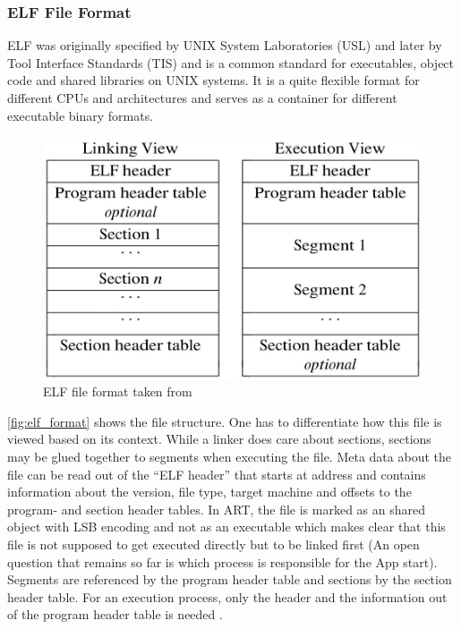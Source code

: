 \subsubsection{ELF File Format}\label{section:elf_file_format}
ELF was originally specified by UNIX System Laboratories
(USL) and later by Tool Interface Standards (TIS) and is a common
standard for executables, object code and shared libraries on UNIX
systems. It is a quite flexible format for different CPUs and
architectures and serves as a container for different
executable binary formats.

\begin{figure}[htb]
  \centering
  \includegraphics[scale=0.4]{figures/elf_format}
  \caption[ELF file format]{ELF file format taken from \parencite{portable_formats_spec}}
  \label{fig:elf_format}
\end{figure}

\autoref{fig:elf_format} shows the file structure.
One has to differentiate how this file is viewed based on its context.
While a linker does care about sections, sections may be
glued together to segments when executing the file.
Meta data about the file can be read out of the ``ELF header''
that starts at address  and contains
information about the version, file type, target machine and
offsets to the program- and section header tables.
In ART, the file is marked as an shared object with LSB encoding
and not as an executable which makes clear that this file is not
supposed to get executed directly but to be linked first
(An open question that remains so far is which process is responsible
for the App start).
Segments are referenced by the program header table and sections
by the section header table. For an execution process, only the header
and the information out of the program header table is needed
\parencite{life_of_binaries}.


